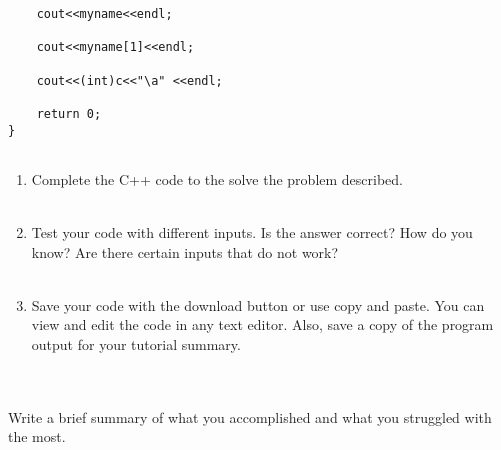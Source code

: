 \documentclass[12pt]{article}
\begin{document}
\begin{description}[labelindent=1cm]
\begin{enumerate}
\begin{lstlisting}
	cout<<myname<<endl; 
	
	cout<<myname[1]<<endl;
	
	cout<<(int)c<<"\a" <<endl; 
	
	return 0;
}


	\end{lstlisting}
		
\end{enumerate}

	\item[\textbf{\underline{Part 3 - Testing:}}] \hfill \vspace{0mm}
	\begin{enumerate}
	
		\item Complete the C++ code to the solve the problem described. \\\\
		
		\item Test your code with different inputs. Is the answer correct? How do you know? Are there certain inputs that do not work? \\\\
		
	
		\item Save your code with the download button or use copy and paste. You can view and edit the code in any text editor. Also, save a copy of the program output for your tutorial summary. \\\\

	\end{enumerate}

\newpage
\item[\textbf{\underline{Solution Code:}}] \hfill \vspace{0mm}
%
%
%
%

\newpage
\item[\textbf{\underline{Tutorial Summary:}}] \hfill \vspace{3mm}\\ 
Write a brief summary of what you accomplished and what you struggled with the most. 


\end{description}
\end{document}
